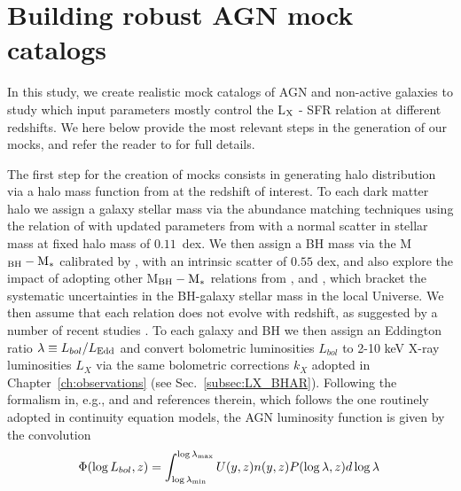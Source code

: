 \section{Building robust AGN mock catalogs}\label{sec:model}
In this study, we create realistic mock catalogs of AGN and non-active galaxies to study which input parameters mostly control the L$_{\rm X}$ - SFR relation at different redshifts. We here below provide the most relevant steps in the generation of our mocks, and refer the reader to \citet{Allevato21} for full details.

 The first step for the creation of mocks consists in generating halo distribution via a halo mass function from \citet{2008ApJ...688..709T} at the redshift of interest. To each dark matter halo we assign a galaxy stellar mass via the abundance matching techniques using the relation of \citet[][]{moster10} with updated parameters from \citet[][Eq.~5]{2019MNRAS.483.2506G} with a normal scatter in stellar mass at fixed halo mass of $0.11$~dex.
We then assign a BH mass via the M$_{\rm BH}-{\rm M}_*$ calibrated by \citet{2015ApJ...813...82R}, with an intrinsic scatter of $0.55$ dex, and also explore the impact of adopting other M$_{\rm BH}-{\rm M}_*$ relations from \citet{2016MNRAS.460.3119S}, \citet{2018ApJ...869..113D} and \citet{2019ApJ...876..155S}, which bracket the systematic uncertainties in the BH-galaxy stellar mass in the local Universe. 
We then assume that each relation does not evolve with redshift, as suggested by a number of recent studies \citep[e.g.][and Fig.~\ref{fig:comp_models}]{2019ApJ...885L..36D, Suh20, Shankar20MNRAS}.
To each galaxy and BH we then assign an Eddington ratio $\lambda\equiv L_{bol}/L_{\rm Edd}$ and convert bolometric luminosities $L_{bol}$ to 2-10 keV X-ray luminosities $L_X$ via the same bolometric corrections $k_X$ adopted in Chapter~\ref{ch:observations} (see Sec.~\ref{subsec:LX_BHAR}). Following the formalism in, e.g., \citet{Shankar13Acc} and \citet{Allevato21} and references therein, which follows the one routinely adopted in continuity equation models, the AGN luminosity function is given by the convolution
\begin{equation}
\Phi(\log L_{bol},z)=\int_{\log \lambda_{\rm min}}^{\log \lambda_{\rm max}}U(y,z) n(y,z) P(\log \lambda,z)d\log \lambda \, 
\label{eq:PhiL}
\end{equation}
